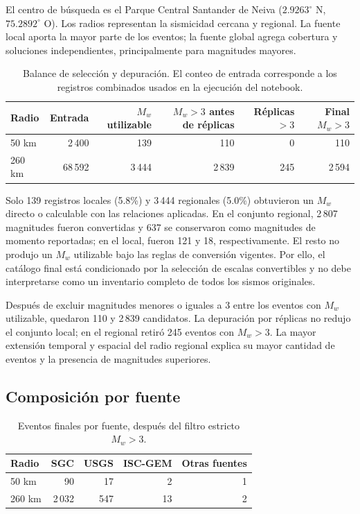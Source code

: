 \documentclass[12pt]{article}
\begin{document}
El centro de búsqueda es el Parque Central Santander de Neiva
($2.9263^\circ$ N, $75.2892^\circ$ O). Los radios representan la sismicidad
cercana y regional. La fuente local aporta la mayor parte de los eventos; la
fuente global agrega cobertura y soluciones independientes, principalmente
para magnitudes mayores.

\begin{table}[H]
\centering
\caption{Balance de selección y depuración. El conteo de entrada corresponde a los registros combinados usados en la ejecución del notebook.}
\label{tab:balance}
\small
\begin{tabular}{lrrrrr}
\toprule
Radio & Entrada & $M_w$ utilizable & $M_w>3$ antes de réplicas & Réplicas $>3$ & Final $M_w>3$ \\
\midrule
50 km  & 2\,400  & 139   & 110   & 0   & 110 \\
260 km & 68\,592 & 3\,444 & 2\,839 & 245 & 2\,594 \\
\bottomrule
\end{tabular}
\end{table}

Solo 139 registros locales (5.8\%) y 3\,444 regionales (5.0\%) obtuvieron
un $M_w$ directo o calculable con las relaciones aplicadas. En el conjunto
regional, 2\,807 magnitudes fueron convertidas y 637 se conservaron como
magnitudes de momento reportadas; en el local, fueron 121 y 18,
respectivamente. El resto no produjo un $M_w$ utilizable bajo las reglas de
conversión vigentes. Por ello, el catálogo final está condicionado por la
selección de escalas convertibles y no debe interpretarse como un inventario
completo de todos los sismos originales.

Después de excluir magnitudes menores o iguales a 3 entre los eventos con
$M_w$ utilizable, quedaron 110 y 2\,839 candidatos. La depuración por
réplicas no redujo el conjunto local; en el regional retiró 245 eventos con
$M_w>3$. La mayor extensión temporal y espacial del radio regional explica su
mayor cantidad de eventos y la presencia de magnitudes superiores.

\subsection{Composición por fuente}

\begin{table}[H]
\centering
\caption{Eventos finales por fuente, después del filtro estricto $M_w>3$.}
\label{tab:fuentes}
\begin{tabular}{lrrrr}
\toprule
Radio & SGC & USGS & ISC-GEM & Otras fuentes \\
\midrule
50 km  & 90   & 17  & 2  & 1 \\
260 km & 2\,032 & 547 & 13 & 2 \\
\bottomrule
\end{tabular}
\end{table}
\end{document}
